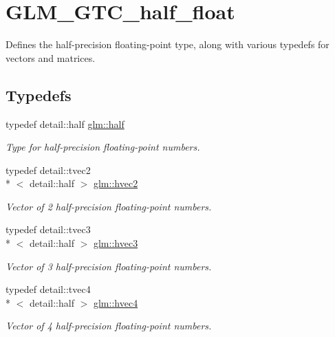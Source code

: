 \hypertarget{group__gtc__half__float}{\section{G\-L\-M\-\_\-\-G\-T\-C\-\_\-half\-\_\-float}
\label{group__gtc__half__float}
}


Defines the half-\/precision floating-\/point type, along with various typedefs for vectors and matrices.  


\subsection*{Typedefs}
\begin{DoxyCompactItemize}
\item 
typedef detail\-::half \hyperlink{group__gtc__half__float_gadae4de950aa2230455634615b782c151}{glm\-::half}
\begin{DoxyCompactList}\small\item\em Type for half-\/precision floating-\/point numbers. \end{DoxyCompactList}\item 
typedef detail\-::tvec2\\*
$<$ detail\-::half $>$ \hyperlink{group__gtc__half__float_gafad70a9362e123cafc2807e93c292173}{glm\-::hvec2}
\begin{DoxyCompactList}\small\item\em Vector of 2 half-\/precision floating-\/point numbers. \end{DoxyCompactList}\item 
typedef detail\-::tvec3\\*
$<$ detail\-::half $>$ \hyperlink{group__gtc__half__float_ga7f3d584efe4e61946fb06ce920b6919f}{glm\-::hvec3}
\begin{DoxyCompactList}\small\item\em Vector of 3 half-\/precision floating-\/point numbers. \end{DoxyCompactList}\item 
typedef detail\-::tvec4\\*
$<$ detail\-::half $>$ \hyperlink{group__gtc__half__float_ga377f6d7c1e25bda8eb1393f5cc74acd4}{glm\-::hvec4}
\begin{DoxyCompactList}\small\item\em Vector of 4 half-\/precision floating-\/point numbers. \end{DoxyCompactList}\item 

\end{DoxyCompactItemize}

